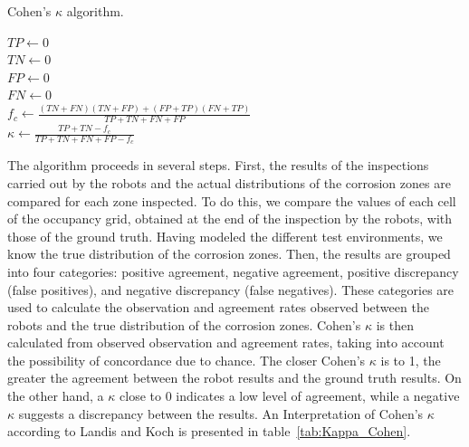 \documentclass[english,RandD]{rapportPFE}  %
\begin{document}
			\begin{algorithm}[h!]
				\caption{Cohen's $\kappa$ algorithm.}
				\label{alg:Cohen_Kappa}
				\KwResult{$\kappa \in [0, 1]$}
				$TP \gets 0$ \\
				$TN \gets 0$ \\
				$FP \gets 0$ \\
				$FN \gets 0$ \\
				$f_c \gets \frac{(TN + FN) (TN + FP) + (FP + TP) (FN + TP)}{TP + TN + FN +FP}$ \\
				$\kappa \gets \frac{TP + TN - f_c}{TP + TN + FN + FP - f_c}$
			\end{algorithm}

			The algorithm proceeds in several steps.
			First, the results of the inspections carried out by the robots and the actual distributions of the corrosion zones are compared for each zone inspected.
			To do this, we compare the values of each cell of the occupancy grid, obtained at the end of the inspection by the robots, with those of the ground truth.
			Having modeled the different test environments, we know the true distribution of the corrosion zones.
			Then, the results are grouped into four categories: positive agreement, negative agreement, positive discrepancy (false positives), and negative discrepancy (false negatives).
			These categories are used to calculate the observation and agreement rates observed between the robots and the true distribution of the corrosion zones.
			Cohen's $\kappa$ is then calculated from observed observation and agreement rates, taking into account the possibility of concordance due to chance.
			The closer Cohen's $\kappa$ is to 1, the greater the agreement between the robot results and the ground truth results.
			On the other hand, a $\kappa$ close to 0 indicates a low level of agreement, while a negative $\kappa$ suggests a discrepancy between the results.
			An Interpretation of Cohen's $\kappa$ according to Landis and Koch is presented in table~\ref{tab:Kappa_Cohen}.
\end{document}
